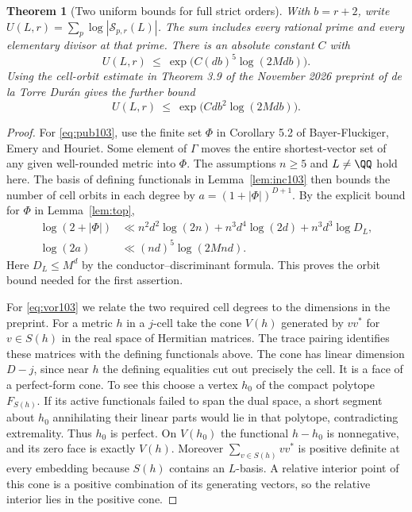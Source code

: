 \documentclass[a4paper,11pt]{article}
\newtheorem{theorem}[proposition]{Theorem}
\theoremstyle{definition}
\theoremstyle{remark}
\numberwithin{equation}{section}
\newcommand{\Sel}{\mathcal S}
\begin{document}
\begin{theorem}[Two uniform bounds for full strict orders]\label{thm:cells103}
With \(b=r+2\), write \(U(L,r)=\sum_p\log|\Sel_{p,r}(L)|\).
The sum includes every rational prime and every elementary
divisor at that prime. There is an absolute constant \(C\) with
\begin{equation}
 U(L,r)\ \le\ \exp\!\big(C(db)^5\log(2Mdb)\big).          \label{eq:pub103}
\end{equation}
Using the cell-orbit estimate in Theorem 3.9 of the November 2026
preprint of de la Torre Dur\'an gives the further bound
\begin{equation}
 U(L,r)\ \le\ \exp\!\big(Cdb^2\log(2Mdb)\big).             \label{eq:vor103}
\end{equation}
\end{theorem}
\begin{proof}
For \eqref{eq:pub103}, use the finite set \(\Phi\) in
Corollary 5.2 of Bayer-Fluckiger, Emery and Houriet. Some element
of \(\Gamma\) moves the entire shortest-vector set of any given
well-rounded metric into \(\Phi\). The assumptions \(n\ge5\) and
\(L\ne\QQ\) hold here. The basis of defining functionals in
Lemma~\ref{lem:inc103} then bounds the number of cell orbits in
each degree by \(a=(1+|\Phi|)^{D+1}\). By the explicit bound for
\(\Phi\) in Lemma~\ref{lem:top},
\[
 \begin{split}
 \log(2+|\Phi|)&\ll
 n^2d^2\log(2n)+n^3d^4\log(2d)+n^3d^3\log D_L,\\
 \log(2a)&\ll (nd)^5\log(2Mnd).
 \end{split}
\]
Here \(D_L\le M^d\) by the conductor--discriminant formula.
This proves the orbit bound needed for the first assertion.~\cite{IV-II-III-beh}

For \eqref{eq:vor103} we relate the two required cell degrees
to the dimensions in the preprint. For a metric \(h\) in a
\(j\)-cell take the cone \(V(h)\) generated by \(vv^*\) for
\(v\in S(h)\) in the real space of Hermitian matrices. The trace
pairing identifies these matrices with the defining functionals
above. The cone has linear dimension \(D-j\), since near \(h\)
the defining equalities cut out precisely the cell. It is a face
of a perfect-form cone. To see this choose a vertex \(h_0\) of the
compact polytope \(F_{S(h)}\). If its active functionals failed
to span the dual space, a short segment about \(h_0\) annihilating
their linear parts would lie in that polytope, contradicting
extremality. Thus \(h_0\) is perfect. On \(V(h_0)\) the functional
\(h-h_0\) is nonnegative, and its zero face is exactly \(V(h)\).
Moreover \(\sum_{v\in S(h)} vv^*\) is positive definite at every
embedding because \(S(h)\) contains an \(L\)-basis. A relative
interior point of this cone is a positive combination of its
generating vectors, so the relative interior lies in the positive
cone.


\end{proof}
\end{document}
